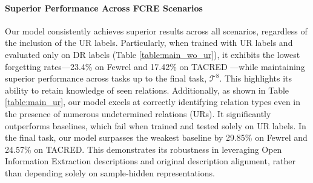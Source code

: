 \paragraph{Superior Performance Across FCRE Scenarios} 
Our model consistently achieves superior results across all scenarios, regardless of the inclusion of the UR labels. Particularly, when trained with UR labels and evaluated only on DR labels (Table \ref{table:main_wo_ur}), it exhibits the lowest forgetting rates—23.4\% on Fewrel and 17.42\% on TACRED —while maintaining superior performance across tasks up to the final task, $\mathcal{T}^8$. This highlights its ability to retain knowledge of seen relations. Additionally, as shown in Table \ref{table:main_ur}, our model excels at correctly identifying relation types even in the presence of numerous undetermined relations (URs). It significantly outperforms baselines, which fail when trained and tested solely on UR labels. In the final task, our model surpasses the weakest baseline by 29.85\% on Fewrel and 24.57\% on TACRED. This demonstrates its robustness in leveraging Open Information Extraction descriptions and original description alignment, rather than depending solely on sample-hidden representations.

